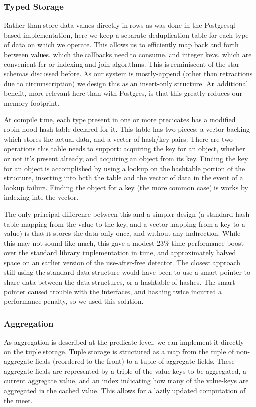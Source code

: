 \subsubsection{Typed Storage}
Rather than store data values directly in rows as was done in the Postgresql-based implementation, here we keep a separate deduplication table for each type of data on which we operate.
This allows us to efficiently map back and forth between values, which the callbacks need to consume, and integer keys, which are convenient for or indexing and join algorithms. 
This is reminiscent of the star schemas discussed before.
As our system is mostly-append (other than retractions due to circumscription) we design this as an insert-only structure.
An additional benefit, more relevant here than with Postgres, is that this greatly reduces our memory footprint.

At compile time, each type present in one or more predicates has a modified robin-hood hash table declared for it.
This table has two pieces: a vector backing which stores the actual data, and a vector of hash/key pairs.
There are two operations this table needs to support: acquiring the key for an object, whether or not it's present already, and acquiring an object from its key.
Finding the key for an object is accomplished by using a lookup on the hashtable portion of the structure, inserting into both the table and the vector of data in the event of a lookup failure.
Finding the object for a key (the more common case) is works by indexing into the vector.

The only principal difference between this and a simpler design (a standard hash table mapping from the value to the key, and a vector mapping from a key to a value) is that it stores the data only once, and without any indirection.
While this may not sound like much, this gave a modest 23\% time performance boost over the standard library implementation in time, and approximately halved space on an earlier version of the use-after-free detector.
The closest approach still using the standard data structure would have been to use a smart pointer to share data between the data structures, or a hashtable of hashes.
The smart pointer caused trouble with the interfaces, and hashing twice incurred a performance penalty, so we used this solution.

\subsubsection{Aggregation}
As aggregation is described at the predicate level, we can implement it directly on the tuple storage.
Tuple storage is structured as a map from the tuple of non-aggregate fields (reordered to the front) to a tuple of aggregate fields.
These aggregate fields are represented by a triple of the value-keys to be aggregated, a current aggregate value, and an index indicating how many of the value-keys are aggregated in the cached value.
This allows for a lazily updated computation of the meet.


